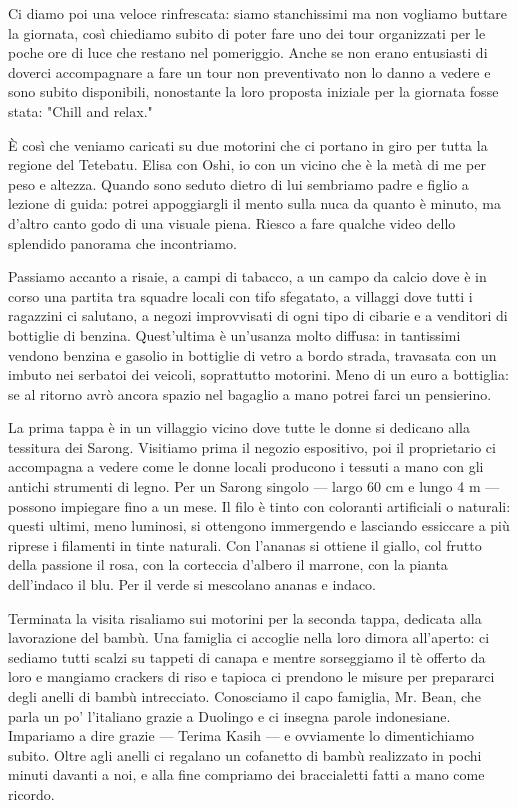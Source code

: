 Ci diamo poi una veloce rinfrescata: siamo stanchissimi ma non vogliamo buttare la giornata, così chiediamo subito di poter fare uno dei tour organizzati per le poche ore di luce che restano nel pomeriggio. Anche se non erano entusiasti di doverci accompagnare a fare un tour non preventivato non lo danno a vedere e sono subito disponibili, nonostante la loro proposta iniziale per la giornata fosse stata: "Chill and relax."

È così che veniamo caricati su due motorini che ci portano in giro per tutta la regione del Tetebatu. Elisa con Oshi, io con un vicino che è la metà di me per peso e altezza. Quando sono seduto dietro di lui sembriamo padre e figlio a lezione di guida: potrei appoggiargli il mento sulla nuca da quanto è minuto, ma d'altro canto godo di una visuale piena. Riesco a fare qualche video dello splendido panorama che incontriamo.

Passiamo accanto a risaie, a campi di tabacco, a un campo da calcio dove è in corso una partita tra squadre locali con tifo sfegatato, a villaggi dove tutti i ragazzini ci salutano, a negozi improvvisati di ogni tipo di cibarie e a venditori di bottiglie di benzina. Quest'ultima è un'usanza molto diffusa: in tantissimi vendono benzina e gasolio in bottiglie di vetro a bordo strada, travasata con un imbuto nei serbatoi dei veicoli, soprattutto motorini. Meno di un euro a bottiglia: se al ritorno avrò ancora spazio nel bagaglio a mano potrei farci un pensierino.

La prima tappa è in un villaggio vicino dove tutte le donne si dedicano alla tessitura dei Sarong. Visitiamo prima il negozio espositivo, poi il proprietario ci accompagna a vedere come le donne locali producono i tessuti a mano con gli antichi strumenti di legno. Per un Sarong singolo — largo 60 cm e lungo 4 m — possono impiegare fino a un mese. Il filo è tinto con coloranti artificiali o naturali: questi ultimi, meno luminosi, si ottengono immergendo e lasciando essiccare a più riprese i filamenti in tinte naturali. Con l'ananas si ottiene il giallo, col frutto della passione il rosa, con la corteccia d'albero il marrone, con la pianta dell'indaco il blu. Per il verde si mescolano ananas e indaco.

Terminata la visita risaliamo sui motorini per la seconda tappa, dedicata alla lavorazione del bambù. Una famiglia ci accoglie nella loro dimora all'aperto: ci sediamo tutti scalzi su tappeti di canapa e mentre sorseggiamo il tè offerto da loro e mangiamo crackers di riso e tapioca ci prendono le misure per prepararci degli anelli di bambù intrecciato. Conosciamo il capo famiglia, Mr. Bean, che parla un po' l'italiano grazie a Duolingo e ci insegna parole indonesiane. Impariamo a dire grazie — Terima Kasih — e ovviamente lo dimentichiamo subito. Oltre agli anelli ci regalano un cofanetto di bambù realizzato in pochi minuti davanti a noi, e alla fine compriamo dei braccialetti fatti a mano come ricordo.

